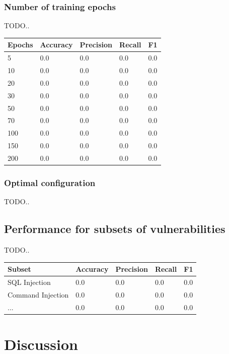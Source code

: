\documentclass[
	a4paper,
	pagesize,
	pdftex,
	12pt,
	twoside, %
	BCOR=5mm, %
	ngerman,
	fleqn,
	final,
	]{scrartcl}
\begin{document}
\subsubsection{Number of training epochs}

TODO..

\begin{tabular}{ | p{2cm} || p{2cm}|p{2cm}|p{2cm}|p{2cm}|  }
	\hline
	Epochs & Accuracy & Precision & Recall & F1 \\
	\hline
	5 & 0.0 &  0.0 &  0.0 &  0.0 \\
	10 & 0.0 &  0.0 &  0.0 &  0.0 \\
	20 & 0.0 &  0.0 &  0.0 &  0.0 \\
	30 & 0.0 &  0.0 &  0.0 &  0.0 \\
	50 & 0.0 &  0.0 &  0.0 &  0.0 \\
	70 & 0.0 &  0.0 &  0.0 &  0.0 \\
	100 & 0.0 &  0.0 &  0.0 &  0.0 \\
	150 & 0.0 &  0.0 &  0.0 &  0.0 \\
	200 & 0.0 &  0.0 &  0.0 &  0.0 \\
	\hline
	\hline
\end{tabular}

\subsubsection{Optimal configuration}


TODO..






\subsection{Performance for subsets of vulnerabilities}


TODO..

\begin{tabular}{ | p{5cm} || p{2cm}|p{2cm}|p{2cm}|p{2cm}|  }
	\hline
	Subset & Accuracy & Precision & Recall & F1 \\
	\hline
	SQL Injection & 0.0 &  0.0 &  0.0 &  0.0 \\
	Command Injection & 0.0 &  0.0 &  0.0 &  0.0 \\
	... & 0.0 &  0.0 &  0.0 &  0.0 \\
	\hline
	\hline
\end{tabular}



\newpage
\section{Discussion}
\end{document}
